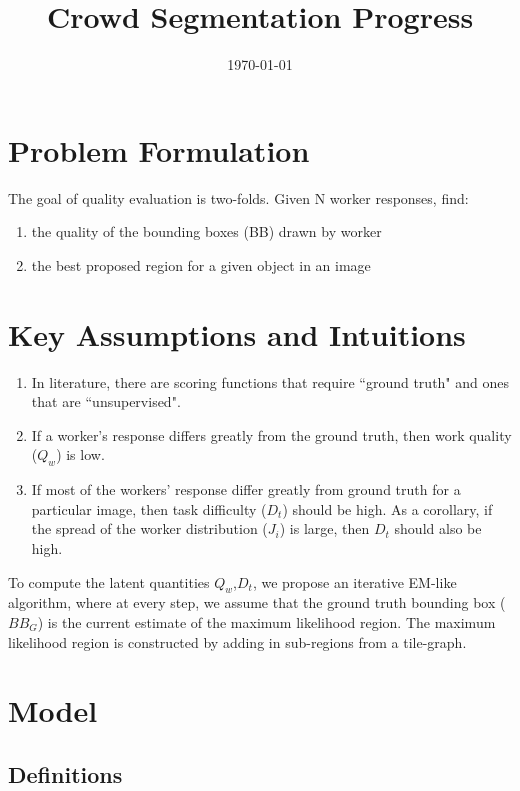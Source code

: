 \documentclass[12pt]{article}
\begin{document}
\title{Crowd Segmentation Progress}
\author{\today}
\date{}
\vspace{-50pt}
\maketitle
\vspace{-70pt}
\section{Problem Formulation}
 The goal of quality evaluation is two-folds. Given N worker responses, find: 
 \begin{enumerate}
\item the quality of the bounding boxes (BB) drawn by worker 
\item the best proposed region for a given object in an image
 \end{enumerate}
\section{Key Assumptions and Intuitions}
\begin{enumerate}
\item In literature, there are scoring functions that require ``ground truth" and ones that are ``unsupervised". 
\item If a worker's response differs greatly from the ground truth, then work quality ($Q_w$) is low. 
\item If most of the workers' response differ greatly from ground truth for a particular image, then task difficulty ($D_t$) should be high. As a corollary, if the spread of the worker distribution ($J_i$) is large, then $D_t$ should also be high.
\end{enumerate}
To compute the latent quantities $Q_w$,$D_t$, we propose an iterative EM-like algorithm, where at every step, we assume that the ground truth bounding box ($BB_G$) is the current estimate of the maximum likelihood region. The maximum likelihood region is constructed by adding in sub-regions from a tile-graph. 
\section{Model}
\subsection{Definitions}
\end{document}
